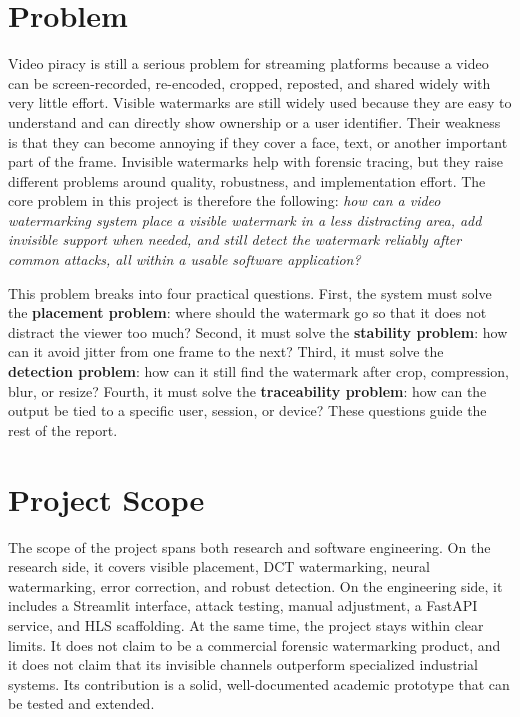 \documentclass[12pt,oneside]{report}
\begin{document}
\section{Problem}
Video piracy is still a serious problem for streaming platforms because a video can be screen-recorded, re-encoded, cropped, reposted, and shared widely with very little effort. Visible watermarks are still widely used because they are easy to understand and can directly show ownership or a user identifier. Their weakness is that they can become annoying if they cover a face, text, or another important part of the frame. Invisible watermarks help with forensic tracing, but they raise different problems around quality, robustness, and implementation effort. The core problem in this project is therefore the following: \textit{how can a video watermarking system place a visible watermark in a less distracting area, add invisible support when needed, and still detect the watermark reliably after common attacks, all within a usable software application?}

This problem breaks into four practical questions. First, the system must solve the \textbf{placement problem}: where should the watermark go so that it does not distract the viewer too much? Second, it must solve the \textbf{stability problem}: how can it avoid jitter from one frame to the next? Third, it must solve the \textbf{detection problem}: how can it still find the watermark after crop, compression, blur, or resize? Fourth, it must solve the \textbf{traceability problem}: how can the output be tied to a specific user, session, or device? These questions guide the rest of the report.

\section{Project Scope}
The scope of the project spans both research and software engineering. On the research side, it covers visible placement, DCT watermarking, neural watermarking, error correction, and robust detection. On the engineering side, it includes a Streamlit interface, attack testing, manual adjustment, a FastAPI service, and HLS scaffolding. At the same time, the project stays within clear limits. It does not claim to be a commercial forensic watermarking product, and it does not claim that its invisible channels outperform specialized industrial systems. Its contribution is a solid, well-documented academic prototype that can be tested and extended.
\end{document}
